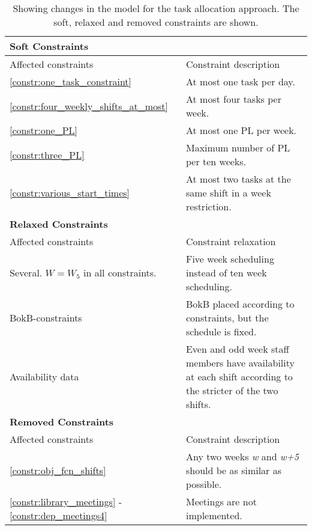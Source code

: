 \begin{table}[!h]
\centering
\caption{Showing changes in the model for the task allocation approach. The soft, relaxed and removed constraints are shown.}
\label{tab:task_constraints}
\begin{tabular}{|p{4cm}|p{7cm}|}
\hline
\multicolumn{2}{|l|}{\cellcolor{gray!90} \textbf{Soft Constraints}} \\
\hline 
\rowcolor{Gray} Affected constraints & Constraint description \\ \hline
\ref{constr:one_task_constraint} & At most one task per day.  \\ \hline
\ref{constr:four_weekly_shifts_at_most} & At most four tasks per week. \\ \hline
\ref{constr:one_PL} & At most one PL per week. \\ \hline
\ref{constr:three_PL} & Maximum number of PL per ten weeks. \\ \hline
\ref{constr:various_start_times} & At most two tasks at the same shift in a week restriction.  \\ \hline
\multicolumn{2}{|l|}{\cellcolor{gray!90} \textbf{Relaxed Constraints}} \\
\hline 
\rowcolor{Gray} Affected constraints & Constraint relaxation \\ \hline
Several. $W = W_5$ in all constraints. & Five week scheduling instead of ten week scheduling. \\ \hline
BokB-constraints & BokB placed according to constraints, but the schedule is fixed. \\ \hline
Availability data & Even and odd week staff members have availability at each shift according to the stricter of the two shifts. \\ \hline
\multicolumn{2}{|l|}{\cellcolor{gray!90} \textbf{Removed Constraints}} \\
\hline 
\rowcolor{Gray} Affected constraints & Constraint description \\ \hline
\ref{constr:obj_fcn_shifts} & Any two weeks \textit{w} and \textit{w+5} should be as similar as possible. \\ \hline
\ref{constr:library_meetings} - \ref{constr:dep_meetings4} & Meetings are not implemented. \\ \hline
\end{tabular}
\end{table}

